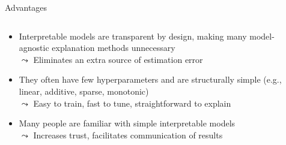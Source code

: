 \documentclass[10pt,compress,t,notes=noshow, xcolor=table]{beamer}
\begin{document}
\begin{frame}{Advantages}
\begin{columns}[T, totalwidth=\textwidth]
\begin{column}{0.8\textwidth}
    \begin{itemize}[<+->]
    \itemsep1em
        \item Interpretable models are transparent by design, making many model-agnostic explanation methods unnecessary\\
        $\leadsto$ Eliminates an extra source of estimation error
        \item They often have few hyperparameters and are structurally simple (e.g., linear, additive, sparse, monotonic)\\
        $\leadsto$ Easy to train, fast to tune, straightforward to explain
        \item Many people are familiar with simple interpretable models \\
        $\leadsto$ Increases trust, facilitates communication of results
    \end{itemize}
\end{column}
\begin{column}{0.2\textwidth}
    \begin{center}
\end{center}
\end{column}
\end{columns}
\end{frame}
\end{document}
